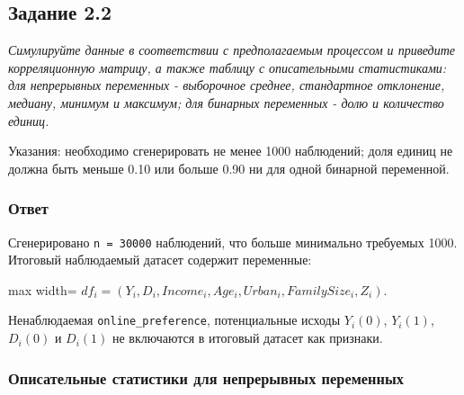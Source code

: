 \documentclass[11pt]{article}
\newenvironment{tasktext}
      {\begin{tcolorbox}[breakable, colback=black!3, colframe=black!28,
        boxrule=0.4pt, arc=1.5mm, left=7pt, right=7pt, top=5pt, bottom=5pt,
        before skip=0.35em, after skip=0.75em]\itshape}
      {\end{tcolorbox}}
\begin{document}
    \subsection{Задание 2.2}\label{ux437ux430ux434ux430ux43dux438ux435-2.2}

\begin{tasktext}
Симулируйте данные в соответствии с предполагаемым процессом и приведите
корреляционную матрицу, а также таблицу с описательными статистиками:
для непрерывных переменных - выборочное среднее, стандартное отклонение,
медиану, минимум и максимум; для бинарных переменных - долю и количество
единиц.

Указания: необходимо сгенерировать не менее 1000 наблюдений; доля единиц
не должна быть меньше 0.10 или больше 0.90 ни для одной бинарной
переменной.
\end{tasktext}

\subsubsection{Ответ}\label{ux43eux442ux432ux435ux442}

Сгенерировано \texttt{n\ =\ 30000} наблюдений, что больше минимально
требуемых 1000. Итоговый наблюдаемый датасет содержит переменные:

\begin{center}
\begin{adjustbox}{max width=\linewidth}
\(\displaystyle df_i = (Y_i, D_i, Income_i, Age_i, Urban_i, FamilySize_i, Z_i).\)
\end{adjustbox}
\end{center}

Ненаблюдаемая \texttt{online\_preference}, потенциальные исходы
\(Y_i(0)\), \(Y_i(1)\), \(D_i(0)\) и \(D_i(1)\) не включаются в итоговый
датасет как признаки.

\subsubsection{Описательные статистики для непрерывных
переменных}\label{ux43eux43fux438ux441ux430ux442ux435ux43bux44cux43dux44bux435-ux441ux442ux430ux442ux438ux441ux442ux438ux43aux438-ux434ux43bux44f-ux43dux435ux43fux440ux435ux440ux44bux432ux43dux44bux445-ux43fux435ux440ux435ux43cux435ux43dux43dux44bux445}
\end{document}
